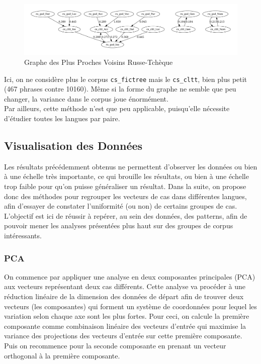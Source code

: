 \documentclass{cours}
\begin{document}
\begin{figure}[H]
	\centering
	\includegraphics[width=\textwidth]{Figures/GNN/gnn_ru_gsd_cs_cltt}
	\caption{Graphe des Plus Proches Voisins Russe-Tchèque}
	\label{GNNRuCz}
\end{figure}

Ici, on ne considère plus le corpus \texttt{cs\_fictree} mais le \texttt{cs\_cltt}, bien plus petit (467 phrases contre 10160).
Même si la forme du graphe ne semble que peu changer, la variance dans le corpus joue énormément.\\
Par ailleurs, cette méthode n'est que peu applicable, puisqu'elle nécessite d'étudier toutes les langues par paire.

\subsection{Visualisation des Données}\label{subsec:vis}
Les résultats précédemment obtenus ne permettent d'observer les données ou bien à une échelle très importante, ce qui brouille les résultats, ou bien à une échelle trop faible pour qu'on puisse généraliser un résultat.
Dans la suite, on propose donc des méthodes pour regrouper les vecteurs de cas dans différentes langues, afin d'essayer de constater l'uniformité (ou non) de certains groupes de cas.
L'objectif est ici de réussir à repérer, au sein des données, des patterns, afin de pouvoir mener les analyses présentées plus haut sur des groupes de corpus intéressants.


\subsubsection{PCA}\label{subsub:pca}
On commence par appliquer une analyse en deux composantes principales (PCA) aux vecteurs représentant deux cas différents.
Cette analyse va procéder à une réduction linéaire de la dimension des données de départ afin de trouver deux vecteurs (les composantes) qui forment un système de coordonnées pour lequel les variation selon chaque axe sont les plus fortes.
Pour ceci, on calcule la première composante comme combinaison linéaire des vecteurs d'entrée qui maximise la variance des projections des vecteurs d'entrée sur cette première composante. Puis on recommence pour la seconde composante en prenant un vecteur orthogonal à la première composante.
\end{document}

